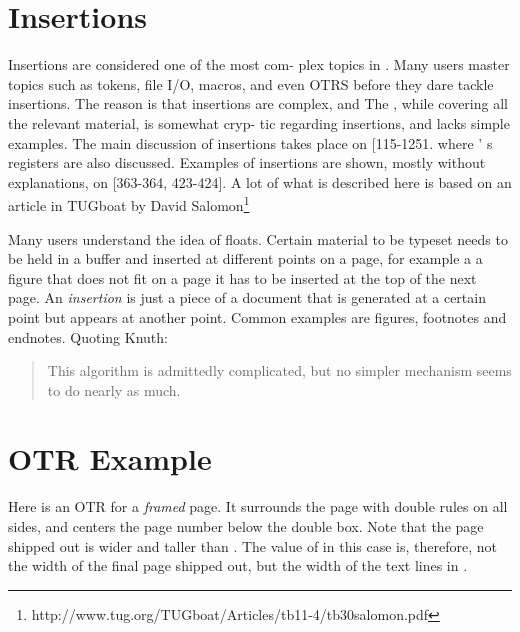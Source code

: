 \section{Insertions}
Insertions are considered one of  the most  com- 
plex  topics in \tex. Many users master  topics  such 
as tokens,  file  I/O, macros,  and  even  OTRS  before 
they dare  tackle  insertions.  The  reason  is  that 
insertions  are  complex,  and  The \texbook, while 
covering all the relevant material, is somewhat cryp- 
tic regarding  insertions, and  lacks  simple examples. 
The  main  discussion  of  insertions takes  place  on 
[115-1251.  where \tex' s  registers  are also discussed. 
Examples  of  insertions are  shown, mostly  without 
explanations,  on  [363-364,  423-424].  A lot of what is described here is based on an article in TUGboat by David Salomon\footnote{ 
http://www.tug.org/TUGboat/Articles/tb11-4/tb30salomon.pdf}

Many users understand the idea of floats. Certain material to be typeset needs to be held in a buffer and inserted at different points on a page, for example a a figure that does not fit on a page it has to be inserted at the top of the next page. An \textit{insertion} is just a piece of a document that is generated at a certain point but appears at another point. Common examples are figures, footnotes and endnotes. Quoting Knuth:

\begin{quote}
  This  algorithm  is  admittedly  complicated, 
but  no  simpler  mechanism  seems  to  do  nearly 
as  much.
\end{quote}

\section{OTR Example}

\begin{comment}
\begin{figure}%
 \centering
  \texttt{[image: ./graphics/framedpage.jpg]}
  \caption{A boxed page}
  \label{fig:framedpage}
\end{figure}
\end{comment}

Here is an OTR for a \textit{framed} page. It surrounds the
page with double rules on all sides, and centers the
page number below the double box. Note that the
page shipped out is wider and taller than .
The value of  in this case is, therefore, not
the width of the final page shipped out, but the
width of the text lines in .

